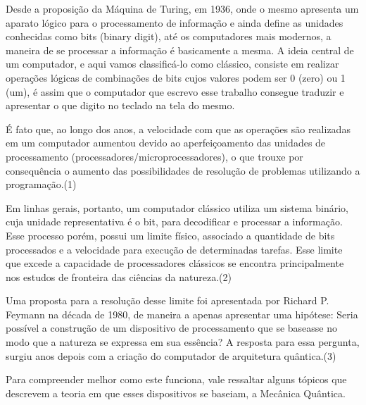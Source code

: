\documentclass[12pt,oneside,brazil,hidelinks,article,sumario=tradicional,a4paper]{abntex2}
\begin{document}
Desde a proposição da Máquina de Turing, em 1936, onde o mesmo apresenta um aparato lógico para o processamento de informação e ainda define as unidades conhecidas como bits (binary digit), até os computadores mais modernos, a maneira de se processar a informação é basicamente a mesma. A ideia central de um computador, e aqui vamos classificá-lo como clássico, consiste em realizar operações lógicas de combinações de bits cujos valores podem ser 0 (zero) ou 1 (um), é assim que o computador que escrevo esse trabalho consegue traduzir e apresentar o que digito no teclado na tela do mesmo. 

É fato que, ao longo dos anos, a velocidade com que as operações são realizadas em um computador aumentou devido ao aperfeiçoamento das unidades de processamento (processadores/microprocessadores), o que trouxe por consequência o aumento das possibilidades de resolução de problemas utilizando a programação.(1)

Em linhas gerais, portanto, um computador clássico utiliza um sistema binário, cuja unidade representativa é o bit, para decodificar e processar a informação. Esse processo porém, possui um limite físico, associado a quantidade de bits processados e a velocidade para execução de determinadas tarefas. Esse limite que excede a capacidade de processadores clássicos se encontra principalmente nos estudos de fronteira das ciências da natureza.(2)

Uma proposta para a resolução desse limite foi apresentada por Richard P. Feymann na década de 1980, de maneira a apenas apresentar uma hipótese: Seria possível a construção de um dispositivo de processamento que se baseasse no modo que a natureza se expressa em sua essência? A resposta para essa pergunta, surgiu anos depois com a criação do computador de arquitetura quântica.(3)

Para compreender melhor como este funciona, vale ressaltar alguns tópicos que descrevem a teoria em que esses dispositivos se baseiam, a Mecânica Quântica.

\end{document}
